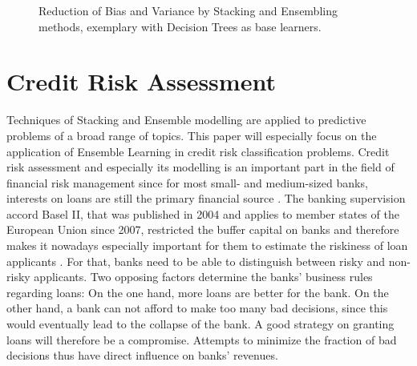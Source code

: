 \documentclass[12pt]{article}
\begin{document}
\begin{figure}[!htp] 
\caption[Bias and Variance Reduction]{Reduction of Bias and Variance by Stacking and Ensembling methods, exemplary with Decision Trees as base learners.}\label{bv}
\end{figure} 


\section{Credit Risk Assessment}\label{creditrisk}
Techniques of Stacking and Ensemble modelling are applied to predictive problems of a broad range of topics. This paper will especially focus on the application of Ensemble Learning in credit risk classification problems. Credit risk assessment and especially its modelling is an important part in the field of financial risk management since for most small- and medium-sized banks, interests on loans are still the primary financial source \citep[p.2]{jacobson2006internal}. The banking supervision accord Basel II, that was published in 2004 and applies to member states of the European Union since 2007, restricted the buffer capital on banks and therefore makes it nowadays especially important for them to estimate the riskiness of loan applicants \citep[cp.][]{basel2}. For that, banks need to be able to distinguish between risky and non-risky applicants. Two opposing factors determine the banks' business rules regarding loans: On the one hand, more loans are better for the bank. On the other hand, a bank can not afford to make too many bad decisions, since this would eventually lead to the collapse of the bank. A good strategy on granting loans will therefore be a compromise. Attempts to minimize the fraction of bad decisions thus have direct influence on banks' revenues.
\end{document}
